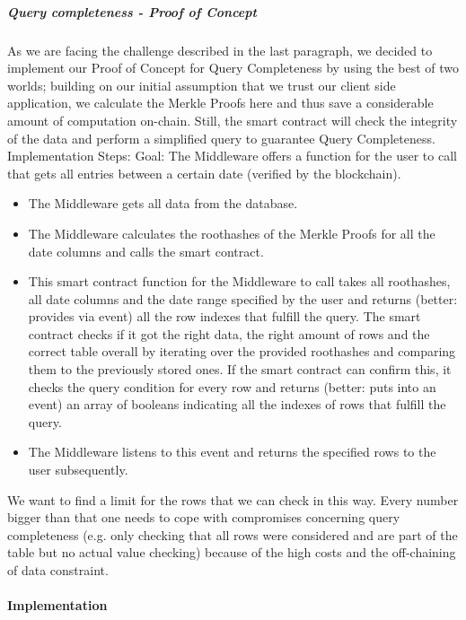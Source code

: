 \subparagraph{Query completeness - Proof of Concept}
As we are facing the challenge described in the last paragraph, we decided to implement our Proof of Concept for Query Completeness by using the best of two worlds; building on our initial assumption that we trust our client side application, we calculate the Merkle Proofs here and thus save a considerable amount of computation on-chain. Still, the smart contract will check the integrity of the data and perform a simplified query to guarantee Query Completeness.
Implementation Steps:
Goal: The Middleware offers a function for the user to call that gets all entries between a certain date (verified by the blockchain).
\begin{itemize}
\item The Middleware gets all data from the database.
\item The Middleware calculates the roothashes of the Merkle Proofs for all the date columns and calls the smart contract.
\item This smart contract function for the Middleware to call takes all roothashes, all date columns and the date range specified by the user and returns (better: provides via event) all the row indexes that fulfill the query.
The smart contract checks if it got the right data, the right amount of rows and the correct table overall by iterating over the provided roothashes and comparing them to the previously stored ones.
If the smart contract can confirm this, it checks the query condition for every row and returns (better: puts into an event) an array of booleans indicating all the indexes of rows that fulfill the query.
\item The Middleware listens to this event and returns the specified rows to the user subsequently.
\end{itemize}
We want to find a limit for the rows that we can check in this way. Every number bigger than that one needs to cope with compromises concerning query completeness (e.g. only checking that all rows were considered and are part of the table but no actual value checking) because of the high costs and the off-chaining of data constraint.

\paragraph{Implementation}
